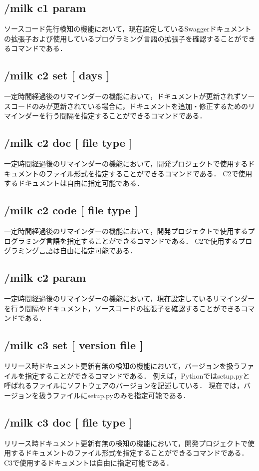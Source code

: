 \subsection*{/milk c1 param}
ソースコード先行検知の機能において，現在設定しているSwaggerドキュメントの拡張子および使用しているプログラミング言語の拡張子を確認することができるコマンドである．

\subsection*{/milk c2 set [ days ]}
一定時間経過後のリマインダーの機能において，ドキュメントが更新されずソースコードのみが更新されている場合に，ドキュメントを追加・修正するためのリマインダーを行う間隔を指定することができるコマンドである．

\subsection*{/milk c2 doc [ file type ]}
一定時間経過後のリマインダーの機能において，開発プロジェクトで使用するドキュメントのファイル形式を指定することができるコマンドである．
C2で使用するドキュメントは自由に指定可能である．

\subsection*{/milk c2 code [ file type ]}
一定時間経過後のリマインダーの機能において，開発プロジェクトで使用するプログラミング言語を指定することができるコマンドである．
C2で使用するプログラミング言語は自由に指定可能である．

\subsection*{/milk c2 param}
一定時間経過後のリマインダーの機能において，現在設定しているリマインダーを行う間隔やドキュメント，ソースコードの拡張子を確認することができるコマンドである．

\subsection*{/milk c3 set [ version file ]}
リリース時ドキュメント更新有無の検知の機能において，バージョンを扱うファイルを指定することができるコマンドである．
例えば，Pythonではsetup.pyと呼ばれるファイルにソフトウェアのバージョンを記述している．
現在では，バージョンを扱うファイルにsetup.pyのみを指定可能である．

\subsection*{/milk c3 doc [ file type ]}
リリース時ドキュメント更新有無の検知の機能において，開発プロジェクトで使用するドキュメントのファイル形式を指定することができるコマンドである．
C3で使用するドキュメントは自由に指定可能である．


